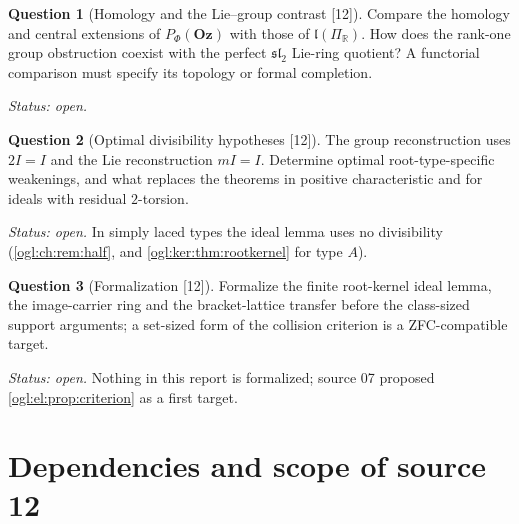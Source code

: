 \documentclass[11pt,oneside]{article}
\numberwithin{equation}{section}
\theoremstyle{definition}
\newtheorem{question}[question]{Question}
\theoremstyle{remark}
\newcommand{\Oz}{\mathbf{Oz}}
\newcommand{\R}{\mathbb R}
\newcommand{\src}[1]{\textup{\textsf{\small[#1]}}}
\begin{document}
\begin{question}[Homology and the Lie--group contrast \src{12}]\label{ogl:ch:q:homology}
Compare the homology and central extensions of $P_\Phi(\Oz)$ with those of
$\mathfrak l(\Pi_\R)$. How does the rank-one group obstruction coexist with the
perfect $\mathfrak{sl}_2$ Lie-ring quotient? A functorial comparison must specify
its topology or formal completion.
\end{question}
\emph{Status: open.}

\begin{question}[Optimal divisibility hypotheses \src{12}]\label{ogl:ch:q:divisibility}
The group reconstruction uses $2I=I$ and the Lie reconstruction $mI=I$.
Determine optimal root-type-specific weakenings, and what replaces the theorems
in positive characteristic and for ideals with residual $2$-torsion.
\end{question}
\emph{Status: open.} In simply laced types the ideal lemma uses no divisibility
(\cref{ogl:ch:rem:half}, and \cref{ogl:ker:thm:rootkernel} for type $A$).

\begin{question}[Formalization \src{12}]\label{ogl:ch:q:formalization}
Formalize the finite root-kernel ideal lemma, the image-carrier ring and the
bracket-lattice transfer before the class-sized support arguments; a set-sized
form of the collision criterion is a ZFC-compatible target.
\end{question}
\emph{Status: open.} Nothing in this report is formalized; source 07 proposed
\cref{ogl:el:prop:criterion} as a first target.

\section{Dependencies and scope of source 12}\label{ogl:ch:sec:dependencies}
\end{document}
